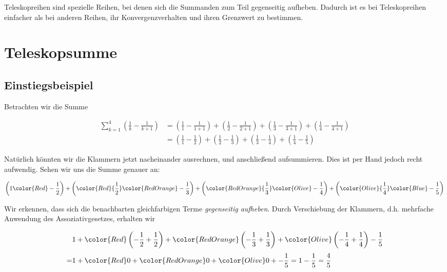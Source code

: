 \documentclass[fontsize=9pt,
               parskip=half-,
               DIV=14,
               listof=chapterentry,
               tocflat]{scrbook}
\begin{document}
Teleskopreihen sind spezielle Reihen, bei denen sich die Summanden zum Teil gegenseitig aufheben. Dadurch ist es bei Teleskopreihen einfacher als bei anderen Reihen, ihr Konvergenzverhalten und ihren Grenzwert zu bestimmen.

\section{Teleskopsumme}

\subsection{Einstiegsbeispiel}

Betrachten wir die Summe

\begin{align*}
\sum _{k=1}^{4}\left({\frac {1}{k}}-{\frac {1}{k+1}}\right)&=\left({\frac {1}{1}}-{\frac {1}{1+1}}\right)+\left({\frac {1}{2}}-{\frac {1}{2+1}}\right)+\left({\frac {1}{3}}-{\frac {1}{3+1}}\right)+\left({\frac {1}{4}}-{\frac {1}{4+1}}\right)\\[0.3em]&=\left({\frac {1}{1}}-{\frac {1}{2}}\right)+\left({\frac {1}{2}}-{\frac {1}{3}}\right)+\left({\frac {1}{3}}-{\frac {1}{4}}\right)+\left({\frac {1}{4}}-{\frac {1}{5}}\right)
\end{align*}

Natürlich könnten wir die Klammern jetzt nacheinander ausrechnen, und anschließend aufsummieren. Dies ist per Hand jedoch recht aufwendig. Sehen wir uns die Summe genauer an:

\begin{align*}
\left(1{\color {Red}-{\frac {1}{2}}}\right)+\left({\color {Red}{\frac {1}{2}}}{\color {RedOrange}-{\frac {1}{3}}}\right)+\left({\color {RedOrange}{\frac {1}{3}}}{\color {Olive}-{\frac {1}{4}}}\right)+\left({\color {Olive}{\frac {1}{4}}}{\color {Blue}-{\frac {1}{5}}}\right)
\end{align*}

Wir erkennen, dass sich die benachbarten gleichfarbigen Terme \emph{gegenseitig aufheben}. Durch Verschiebung der Klammern, d.h. mehrfache Anwendung des Assoziativgesetzes, erhalten wir

\begin{align*}
&1+{\color {Red}\left(-{\frac {1}{2}}+{\frac {1}{2}}\right)}+{\color {RedOrange}\left(-{\frac {1}{3}}+{\frac {1}{3}}\right)}+{\color {Olive}\left(-{\frac {1}{4}}+{\frac {1}{4}}\right)}-{\frac {1}{5}}\\[0.3em]=&1+{\color {Red}0}+{\color {RedOrange}0}+{\color {Olive}0}+-{\frac {1}{5}}=1-{\frac {1}{5}}={\frac {4}{5}}
\end{align*}
\end{document}
